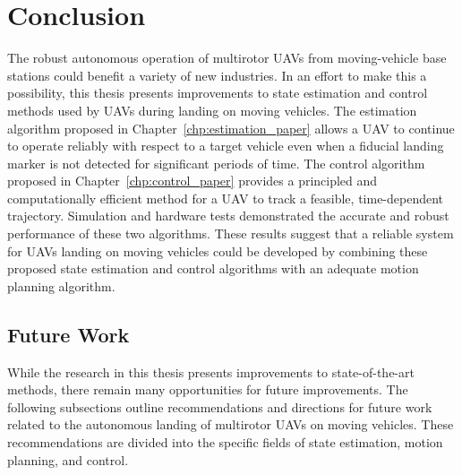 
\chapter{Conclusion}
\label{chp:conclusion}

The robust autonomous operation of multirotor UAVs from moving-vehicle base
stations could benefit a
variety of new industries.
In an effort to make this a possibility,
this
thesis presents improvements to state estimation and control methods used by UAVs
during landing on moving vehicles.
The estimation algorithm proposed in
Chapter~\ref{chp:estimation_paper}
allows a UAV to continue to operate reliably with respect to a target vehicle
even when a fiducial landing marker is not detected for significant
periods of time.
The control algorithm proposed in Chapter~\ref{chp:control_paper} provides a principled
and computationally efficient method for a UAV to track a feasible, time-dependent
trajectory.
Simulation and hardware tests demonstrated the accurate and robust performance
of these two algorithms.
These results suggest that a reliable system for UAVs landing
on moving vehicles could be developed by combining these proposed state
estimation and control algorithms with an adequate motion planning algorithm.

\section{Future Work}
\label{sec:future_work}
While the research in this thesis presents improvements to 
state-of-the-art methods, there remain many opportunities for future
improvements.
The following subsections outline
recommendations and directions for future work related to the autonomous
landing of multirotor UAVs on moving vehicles.
These recommendations are divided into the specific fields of state estimation,
motion planning, and control.


